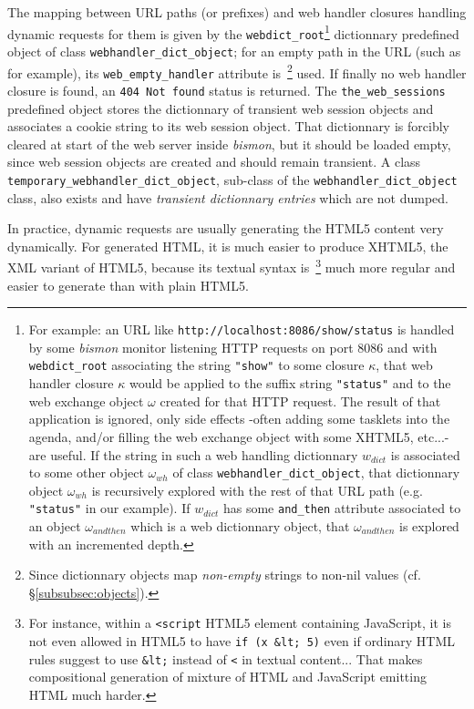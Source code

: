 The mapping between URL paths (or prefixes) and web handler closures
handling dynamic requests for them is given by the  \texttt{webdict\_root}\footnote{For
  example: an URL like \texttt{http://localhost:8086/show/status} is
  handled by some \emph{bismon} monitor listening HTTP requests on
  port 8086 and with \texttt{webdict\_root} associating the string
  \texttt{"show"} to some closure $\kappa$, that web handler closure
  $\kappa$ would be applied to the suffix string \texttt{"status"} and
  to the web exchange object $\omega$ created for that HTTP
  request. The result of that application is ignored, only side
  effects -often adding some tasklets into the agenda, and/or filling
  the web exchange object with some XHTML5, etc...- are useful. If the
  string in such a web handling dictionnary $w_{dict}$ is associated
  to some other object $\omega_{wh}$ of class
  \texttt{webhandler\_dict\_object}, that dictionnary object
  $\omega_{wh}$ is recursively explored with the rest of that URL path
  (e.g. \texttt{"status"} in our example). If $w_{dict}$ has some
  \texttt{and\_then} attribute associated to an object
  $\omega_{andthen}$ which is a web dictionnary object, that
  $\omega_{andthen}$ is explored with an incremented depth.}
 dictionnary predefined object of
class 
\texttt{webhandler\_dict\_object}; for an empty path in the URL (such
as {} for example), its
\texttt{web\_empty\_handler} attribute is~\footnote{Since dictionnary
  objects map \emph{non-empty} strings to non-nil values
  (cf. §\ref{subsubsec:objects}).} used.  If finally no web handler
closure is found, an \texttt{404 Not found} status is returned. The
\texttt{the\_web\_sessions} predefined object stores the dictionnary
of transient web session objects and associates a cookie string to its
web session object. That dictionnary is forcibly cleared at start of
the web server inside \emph{bismon}, but it should be loaded empty,
since web session objects are created and should remain transient.  A
class \texttt{temporary\_webhandler\_dict\_object}, 
sub-class of the \texttt{webhandler\_dict\_object} class, also exists
and have  \emph{transient dictionnary entries} which
are not dumped.

In practice, dynamic requests are usually generating the HTML5
 content very dynamically. For generated HTML, it is much
easier to produce  XHTML5, the XML variant 
of HTML5, because its textual syntax is~\footnote{For instance, within
  a \texttt{<script} HTML5 element containing JavaScript, it is not
  even allowed in HTML5 to have \texttt{if (x \&lt; 5)} even if
  ordinary HTML rules suggest to use \texttt{\&lt;} instead of
  \texttt{<} in textual content... That makes compositional generation
  of mixture of HTML and JavaScript emitting HTML much harder.} much
more regular and easier to generate than with plain HTML5.

